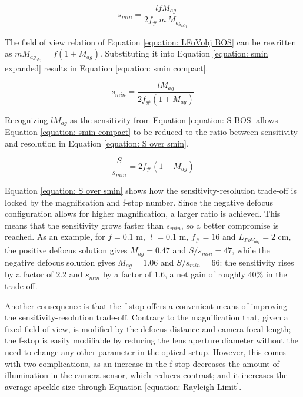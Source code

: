 \begin{equation}
    \label{equation: smin expanded}
    s_{min} = \frac{l f M_{ag}}{2 f_\# \, m \, M_{ag_{obj}}}
\end{equation}

\par The field of view relation of Equation \ref{equation: LFoVobj BOS} can be rewritten as $m M_{ag_{obj}} = f(1+M_{ag})$. Substituting it into Equation \ref{equation: smin expanded} results in Equation \ref{equation: smin compact}.

\begin{equation}
    \label{equation: smin compact}
    s_{min} = \frac{lM_{ag}}{2f_\#(1+M_{ag})}
\end{equation}

\par Recognizing $lM_{ag}$ as the sensitivity from Equation \ref{equation: S BOS} allows Equation \ref{equation: smin compact} to be reduced to the ratio between sensitivity and resolution in Equation \ref{equation: S over smin}.

\begin{equation}
    \label{equation: S over smin}
    \frac{S}{s_{min}} = 2f_\#(1+M_{ag})
\end{equation}

\par Equation \ref{equation: S over smin} shows how the sensitivity-resolution trade-off is locked by the magnification and f-stop number. Since the negative defocus configuration allows for higher magnification, a larger ratio is achieved. This means that the sensitivity grows faster than $s_{min}$, so a better compromise is reached. As an example, for $f = 0.1$ m, $|l| = 0.1$ m, $f_\# = 16$ and $L_{FoV_{obj}} = 2$ cm, the positive defocus solution gives $M_{ag} = 0.47$ and $S/s_{min} = 47$, while the negative defocus solution gives $M_{ag} = 1.06$ and $S/s_{min} = 66$: the sensitivity rises by a factor of $2.2$ and $s_{min}$ by a factor of $1.6$, a net gain of roughly $40\%$ in the trade-off.

\par Another consequence is that the f-stop offers a convenient means of improving the sensitivity-resolution trade-off. Contrary to the magnification that, given a fixed field of view, is modified by the defocus distance and camera focal length; the f-stop is easily modifiable by reducing the lens aperture diameter without the need to change any other parameter in the optical setup. However, this comes with two complications, as an increase in the f-stop decreases the amount of illumination in the camera sensor, which reduces contrast; and it increases the average speckle size through Equation \ref{equation: Rayleigh Limit}.

